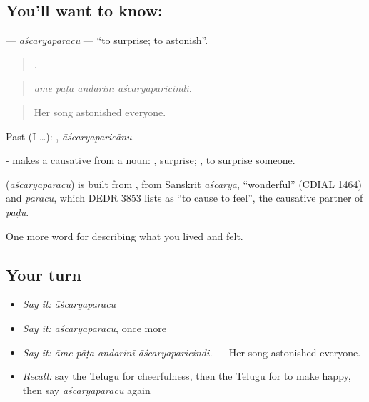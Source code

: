\subsection*{You'll want to know: }
\textbf{} — \emph{āścaryaparacu} — \textquotedblleft{}to surprise; to astonish\textquotedblright{}.

\begin{quote}
   .
\end{quote}

\begin{quote}
\emph{āme pāṭa andarinī āścaryaparicindi.}
\end{quote}

\begin{quote}
Her song astonished everyone.
\end{quote}

Past (I …): , \emph{āścaryaparicānu}.

- makes a causative from a noun: , surprise; , to surprise someone.

\begin{cousinweb}
\textbf{} (\emph{āścaryaparacu}) is built from , from Sanskrit \emph{āścarya}, \textquotedblleft{}wonderful\textquotedblright{} (CDIAL 1464) and \emph{paracu}, which DEDR 3853 lists as \textquotedblleft{}to cause to feel\textquotedblright{}, the causative partner of \emph{paḍu}.
\end{cousinweb}

\begin{grammarlens}[title={What you've built}]
One more word for describing what you lived and felt.
\end{grammarlens}

\subsection*{Your turn}
\begin{itemize}
\raggedright
  \item \emph{Say it:} \emph{āścaryaparacu}
  \item \emph{Say it:} \emph{āścaryaparacu}, once more
  \item \emph{Say it:} \emph{āme pāṭa andarinī āścaryaparicindi.} — Her song astonished everyone.
  \item \emph{Recall:} say the Telugu for cheerfulness, then the Telugu for to make happy, then say \emph{āścaryaparacu} again
\end{itemize}

